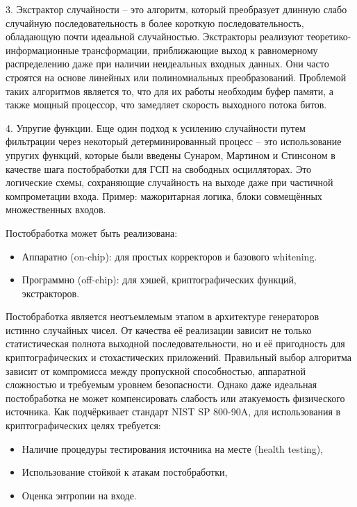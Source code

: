 3. Экстрактор случайности -- это алгоритм, который преобразует длинную
слабо случайную последовательность в более короткую последовательность,
обладающую почти идеальной случайностью. Экстракторы реализуют
теоретико-информационные трансформации, приближающие выход к
равномерному распределению даже при наличии неидеальных входных данных.
Они часто строятся на основе линейных или полиномиальных преобразований.
Проблемой таких алгоритмов является то, что для их работы необходим
буфер памяти, а также мощный процессор, что замедляет скорость выходного
потока битов.

4. Упругие функции. Еще один подход к усилению случайности путем
фильтрации через некоторый детерминированный процесс -- это
использование упругих функций, которые были введены Сунаром, Мартином и
Стинсоном в качестве шага постобработки для ГСП на свободных
осцилляторах. Это логические схемы, сохраняющие случайность на выходе
даже при частичной компрометации входа. Пример: мажоритарная логика,
блоки совмещённых множественных входов.

Постобработка может быть реализована:

\begin{itemize}
\item
  Аппаратно (on-chip): для простых корректоров и базового whitening.
\item
  Программно (off-chip): для хэшей, криптографических функций,
  экстракторов.
\end{itemize}

Постобработка является неотъемлемым этапом в архитектуре генераторов
истинно случайных чисел. От качества её реализации зависит не только
статистическая полнота выходной последовательности, но и её пригодность
для криптографических и стохастических приложений. Правильный выбор
алгоритма зависит от компромисса между пропускной способностью,
аппаратной сложностью и требуемым уровнем безопасности. Однако даже
идеальная постобработка не может компенсировать слабость или атакуемость
физического источника. Как подчёркивает стандарт NIST SP 800-90A, для
использования в криптографических целях требуется:

\begin{itemize}
\item
  Наличие процедуры тестирования источника на месте (health testing),
\item
  Использование стойкой к атакам постобработки,
\item
  Оценка энтропии на входе.
\end{itemize}


